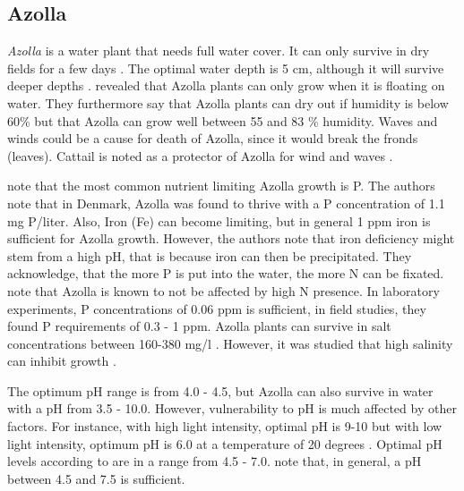 \documentclass[a4paper,12pt]{scrbook}
\begin{document}
\subsection{Azolla}

\textit{Azolla} is a water plant that needs full water cover. It can only survive in dry fields for a few days \citep{wagner1997azolla}. The optimal water depth is 5 cm, although it will survive deeper depths \citep{wagner1997azolla}. \citet{sabetraftar2013review} revealed that Azolla plants can only grow when it is floating on water. They furthermore say that Azolla plants can dry out if humidity is below 60\% but that Azolla can grow well between 55 and 83 \% humidity.  Waves and winds could be a cause for death of Azolla, since it would break the fronds (leaves). Cattail is noted as a protector of Azolla for wind and waves \citep{sabetraftar2013review}.  

\citet{lumpkin1980azolla} note that the most common nutrient limiting Azolla growth is P. The authors note that in Denmark, Azolla was found to thrive with a P concentration of 1.1 mg P/liter. Also, Iron (Fe) can become limiting, but in general 1 ppm iron is  sufficient for Azolla growth. However, the authors note that iron deficiency might stem from a high pH, that is because iron can then be precipitated. They acknowledge, that the more P is put into the water, the more N can be fixated. \citet{sabetraftar2013review} note that Azolla is known to not be affected by high N presence. In laboratory experiments, P concentrations of 0.06 ppm is sufficient, in field studies, they found P requirements of 0.3 - 1 ppm. Azolla plants can survive in salt concentrations between 160-380 mg/l  \citep{lumpkin1980azolla}. However, it was studied that high salinity can inhibit growth \citep{sabetraftar2013review, lumpkin1980azolla}. 

The optimum pH range is from 4.0 - 4.5, but Azolla can also survive in water with a pH from 3.5 - 10.0. However, vulnerability to pH is much affected by other factors. For instance, with high light intensity, optimal pH is 9-10 but with low light intensity, optimum pH is 6.0 at a temperature of 20 degrees \citep{wagner1997azolla}. Optimal pH levels according to \citet{lumpkin1980azolla} are in a range from 4.5 - 7.0. \citet{sabetraftar2013review} note that, in general, a pH between 4.5 and 7.5 is sufficient.


\end{document}
